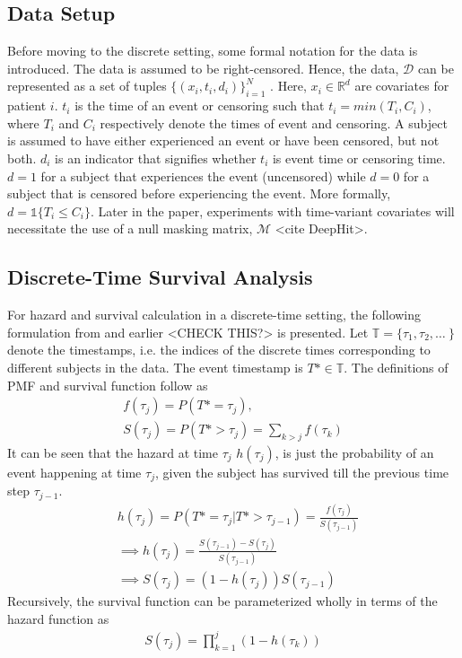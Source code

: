 \documentclass[%
 reprint,
 amsmath,amssymb,
 aps,
]{revtex4-2}
\begin{document}
\subsection{\label{setting}Data Setup}
Before moving to the discrete setting, some formal notation for the data is introduced. The data is assumed to be right-censored. Hence, the data, $\mathcal{D}$ can be represented as a set of tuples $\{(x_i , t_i , d_i)\}_{i=1}^{N}$  \cite{nagpal_deep_2021}. Here, $x_i \in \mathbb{R}^d$ are covariates for patient $i$. $t_i$ is the time of an event or censoring such that $t_i = min(T_i, C_i)$, where $T_i$ and $C_i$ respectively denote the times of event and censoring. A subject is assumed to have either experienced an event or have been censored, but not both. $d_i$ is an indicator that signifies whether $t_i$ is event time or censoring time. $d=1$ for a subject that experiences the event (uncensored) while $d=0$ for a subject that is censored before experiencing the event. More formally, $d= \mathbb{1}\{T_i \le C_i\}$. Later in the paper, experiments with time-variant covariates will necessitate the use of a null masking matrix, $\mathcal{M}$ <cite DeepHit>.\\

\subsection{\label{discrete}Discrete-Time Survival Analysis}
For hazard and survival calculation in a discrete-time setting, the following formulation from \cite{kvamme_continuous_2019} and earlier \cite{Gensheimer_Narasimhan_2019}<CHECK THIS?> is presented. Let $\mathbb{T} = \{\tau_1, \tau_2, \ldots\ \}$ denote the timestamps, i.e. the indices of the discrete times corresponding to different subjects in the data. The event timestamp is $T*\in\mathbb{T}$. The definitions of PMF and survival function follow as
\begin{gather*}
f(\tau_j) = P(T* = \tau_j),\\
S(\tau_j) = P(T* >\tau_j) = \sum_{k>j}f(\tau_k)
\end{gather*}
It can be seen that the hazard at time $\tau_j$ $h(\tau_j)$, is just the probability of an event happening at time $\tau_j$, given the subject has survived till the previous time step $\tau_{j-1}$. 
\begin{align}
&h(\tau_j) = P(T* = \tau_j | T* > \tau_{j-1}) = \frac{f(\tau_j)}{S(\tau_{j-1})} \label{haz_cond_proba}\\
&\implies  h(\tau_j) = \frac{S(\tau_{j-1}) - S(\tau_j)}{S(\tau_{j-1})}\\
&\implies S(\tau_j) = (1 - h(\tau_j))S(\tau_{j-1})
\end{align}
Recursively, the survival function can be parameterized wholly in terms of the hazard function as
\begin{align}
S(\tau_j) = \prod_{k=1}^{j}(1 - h(\tau_k)) \label{cum_haz=surv}
\end{align}
\end{document}
